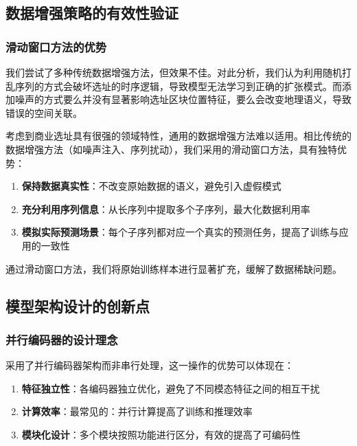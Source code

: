 \documentclass{article}
\begin{document}
\subsection{数据增强策略的有效性验证}

\subsubsection{滑动窗口方法的优势}

我们尝试了多种传统数据增强方法，但效果不佳。对此分析，我们认为利用随机打乱序列的方式会破坏选址的时序逻辑，导致模型无法学习到正确的扩张模式。而添加噪声的方式要么并没有显著影响选址区块位置特征，要么会改变地理语义，导致错误的空间关联。

考虑到商业选址具有很强的领域特性，通用的数据增强方法难以适用。相比传统的数据增强方法（如噪声注入、序列扰动），我们采用的滑动窗口方法，具有独特优势：

\begin{enumerate}
\item \textbf{保持数据真实性}：不改变原始数据的语义，避免引入虚假模式
\item \textbf{充分利用序列信息}：从长序列中提取多个子序列，最大化数据利用率
\item \textbf{模拟实际预测场景}：每个子序列都对应一个真实的预测任务，提高了训练与应用的一致性
\end{enumerate}

通过滑动窗口方法，我们将原始训练样本进行显著扩充，缓解了数据稀缺问题。

\subsection{模型架构设计的创新点}

\subsubsection{并行编码器的设计理念}

采用了并行编码器架构而非串行处理，这一操作的优势可以体现在：

\begin{enumerate}
\item \textbf{特征独立性}：各编码器独立优化，避免了不同模态特征之间的相互干扰
\item \textbf{计算效率}：最常见的：并行计算提高了训练和推理效率
\item \textbf{模块化设计}：多个模块按照功能进行区分，有效的提高了可编码性
\end{enumerate}
\end{document}
